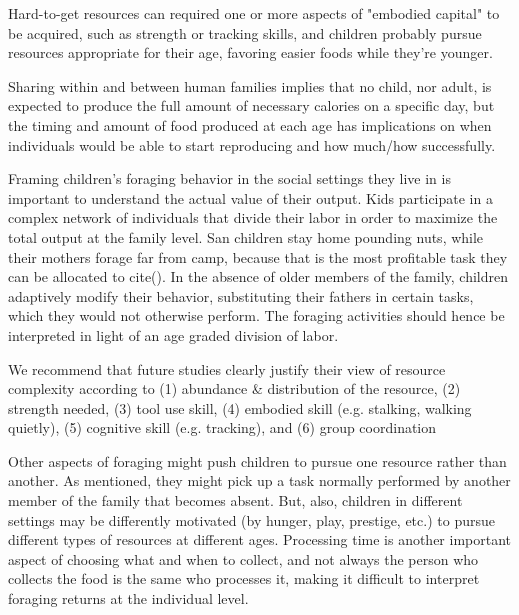 Hard-to-get resources can required one or more aspects of "embodied capital" to be acquired, such as strength or tracking skills, and children probably pursue resources appropriate for their age, favoring easier foods while they're younger. 


Sharing within and between human families implies that no child, nor adult, is expected to produce the full amount of necessary calories on a specific day, but the timing and amount of food produced at each age has implications on when individuals would be able to start reproducing and how much/how successfully.

Framing children's foraging behavior in the social settings they live in is important to understand the actual value of their output. Kids participate in a complex network of individuals that divide their labor in order to maximize the total output at the family level. San children stay home pounding nuts, while their mothers forage far from camp, because that is the most profitable task they can be allocated to cite(). In the absence of older members of the family, children adaptively modify their behavior, substituting their fathers in certain tasks, which they would not otherwise perform. The foraging activities should hence be interpreted in light of an age graded division of labor. 



We recommend that future studies clearly justify their view of resource complexity according to (1) abundance & distribution of the resource, (2) strength needed, (3) tool use skill, (4) embodied skill (e.g. stalking, walking quietly), (5) cognitive skill (e.g. tracking), and (6) group coordination


Other aspects of foraging might push children to pursue one resource rather than another. As mentioned, they might pick up a task normally performed by another member of the family that becomes absent. But, also, children in different settings may be differently motivated (by hunger, play, prestige, etc.) to pursue different types of resources at different ages. Processing time is another important aspect of choosing what and when to collect, and not always the person who collects the food is the same who processes it, making it difficult to interpret foraging returns at the individual level.  


